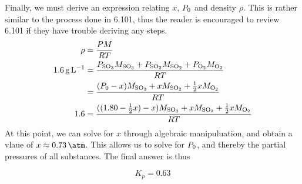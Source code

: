 \documentclass[11 pt]{article}
\newcommand{\p}[1]{
  P_{\ce{#1}}
}
\newcommand{\m}[1]{
  M_{\ce{#1}}
}
\begin{document}
  Finally, we must derive an expression relating $x$, $\p{0}$ and density $\rho$. This is rather similar to the process done in 6.101, thus the reader is encouraged to review 6.101 if they have trouble deriving any steps.
  \begin{align*}
    \rho &= \frac{PM}{RT} \\
     \SI{1.6}{\gram\per\liter}   &= \frac{\p{SO3}\m{SO3} + \p{SO2}\m{SO2} + \p{O2}\m{O2}}{RT} \\
     &= \frac{(\p{0} - x)\m{SO3} + x\m{SO2} + \frac{1}{2}x\m{O2}}{RT} \\
     1.6 &= \frac{((1.80 - \frac{1}{2}x) - x)\m{SO3} + x\m{SO2} + \frac{1}{2}x\m{O2}}{RT}
  \end{align*}
  At this point, we can solve for $x$ through algebraic manipuluation, and obtain a vlaue of $x \approx  \SI{0.73}{\atm}$. This allows us to solve for $\p{0}$, and thereby the partial pressures of all substances. The final answer is thus 
  \begin{answerBox}
    $$K_p = 0.63$$
  \end{answerBox}
\end{document}
